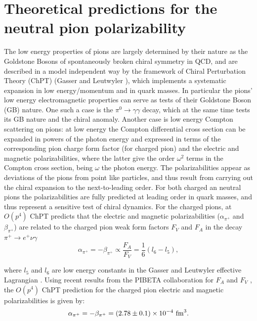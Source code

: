 \section{Theoretical predictions for the neutral pion polarizability}
The low energy properties of pions are largely determined by  their nature as
the Goldstone Bosons of spontaneously broken chiral symmetry in QCD,
and are described in a model independent way by the framework of
Chiral Perturbation Theory (ChPT) (Gasser and Leutwyler
\cite{Gasser:1983yg}), which implements a systematic expansion in low
energy/momentum and in quark masses.  In particular the pions' low
energy electromagnetic properties can serve as tests of their
Goldstone Boson (GB) nature. One such a case is the $\pi^0\to
\gamma\gamma$ decay, which at the same time tests its GB nature and
the chiral anomaly. Another case is low energy Compton scattering on
pions: at low energy the Compton differential cross section can be
expanded in powers of the photon energy and expressed in terms of the
corresponding pion charge form factor (for charged pion) and the electric
and magnetic
polarizabilities, where the latter give the order $\omega^2$ terms in
the Compton cross section, being $\omega$ the photon energy. The
polarizabilities appear as deviations
of the pions from point like particles, and thus result from carrying
out the chiral expansion to the next-to-leading order. For both
charged an neutral pions the polarizabilities are fully predicted at
leading order in quark masses, and thus represent a sensitive test of
chiral dynamics. For the charged pions, at $O(p^4)$ ChPT predicts that
the electric and magnetic polarizabilities ($\alpha_{\pi^+}$ and
$\beta_{\pi^+}$) are related to the charged pion weak form factors
$F_V$ and $F_A$ in the decay $\pi^+ \rightarrow e^+ \nu \gamma$
\begin{equation}\label{alpha_and_beta}
\alpha_{\pi^+} = -\beta_{\pi^+} \propto \frac{F_A}{F_V} = \frac{1}{6} ( l_6 - l_5 ),
\end{equation}

\noindent where $l_5$ and $l_6$ are low energy constants in the Gasser
and Leutwyler effective Lagrangian \cite{Gasser:1983yg}.  Using recent
results from the PIBETA collaboration for $F_A$ and $F_V$
\cite{Bychkov:2008ws}, the $O(p^4)$ ChPT prediction for the charged
pion electric and magnetic polarizabilities is given by:
\begin{equation}\label{one_loop}
\alpha_{\pi^+} = -\beta_{\pi^+} = (2.78 \pm 0.1) \times 10^{-4}~{\rm fm}^3.
\end{equation}

